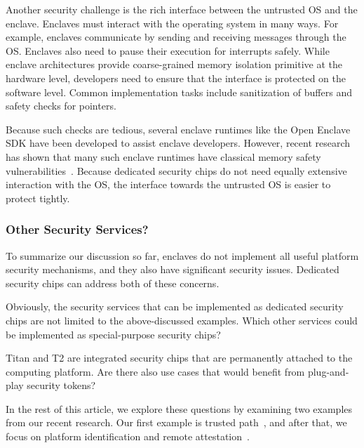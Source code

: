 Another security challenge is the rich interface between the untrusted OS and the enclave. Enclaves must interact with the operating system in many ways. For example, enclaves communicate by sending and receiving messages through the OS. Enclaves also need to pause their execution for interrupts safely. While enclave architectures provide coarse-grained memory isolation primitive at the hardware level, developers need to ensure that the interface is protected on the software level. Common implementation tasks include sanitization of buffers and safety checks for pointers. 

Because such checks are tedious, several enclave runtimes like the Open Enclave SDK have been developed to assist enclave developers. However, recent research has shown that many such enclave runtimes have classical memory safety vulnerabilities~\cite{van2019tale}. Because dedicated security chips do not need equally extensive interaction with the OS, the interface towards the untrusted OS is easier to protect tightly. 


\subsubsection*{Other Security Services?}

To summarize our discussion so far, enclaves do not implement all useful platform security mechanisms, and they also have significant security issues. Dedicated security chips can address both of these concerns. 

Obviously, the security services that can be implemented as dedicated security chips are not limited to the above-discussed examples. Which other services could be implemented as special-purpose security chips? 

Titan and T2 are integrated security chips that are permanently attached to the computing platform. Are there also use cases that would benefit from plug-and-play security tokens?

In the rest of this article, we explore these questions by examining two examples from our recent research. Our first example is trusted path~\cite{protection}, %
and after that, we focus on platform identification and remote attestation~\cite{proximitee}. 
